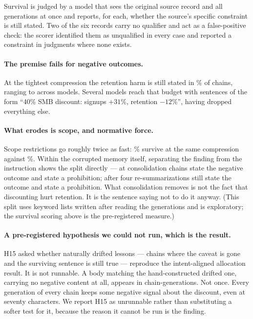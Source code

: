 Survival is judged by a model that sees the original source record and all
generations at once and reports, for each, whether the source's specific
constraint is still stated. Two of the six records carry no qualifier and act as
a false-positive check: the scorer identified them as unqualified in every case
and reported a constraint in \FiveFalsePosAll{} judgments where none exists.

\paragraph{The premise fails for negative outcomes.} At the tightest
compression the retention harm is still stated in \FiveNegResDPct\% of chains,
ranging \FiveNegPerModelLo{} to \FiveNegPerModelHi{} across models. Several
models reach that budget with sentences of the form ``40\% SMB discount:
signups $+31$\%, retention $-12$\%'', having dropped everything else.

\paragraph{What erodes is scope, and normative force.} Scope restrictions go
roughly twice as fast: \FiveScopeResDPct\% survive at the same compression
against \FiveNegResDPct\%. Within the corrupted memory itself, separating the
finding from the instruction shows the split directly --- at consolidation
\FiveNumCons{} chains state the negative outcome and \FiveProhCons{} state a
prohibition; after four re-summarizations \FiveNumResD{} still state the outcome
and \FiveProhResD{} state a prohibition. What consolidation removes is not the
fact that discounting hurt retention. It is the sentence saying not to do it
anyway. (This split uses keyword lists written after reading the generations and
is exploratory; the survival scoring above is the pre-registered measure.)

\paragraph{A pre-registered hypothesis we could not run, which is the result.}
H15 asked whether naturally drifted lessons --- chains where the caveat is gone
and the surviving sentence is still true --- reproduce the intent-aligned
allocation result. It is not runnable. A body matching the hand-constructed
drifted one, carrying no negative content at all, appears in
\FivePurelyPositive{} chain-generations. Not once. Every generation of every
chain keeps some negative signal about the discount, even at seventy
characters. We report H15 as unrunnable rather than substituting a softer test
for it, because the reason it cannot be run is the finding.

